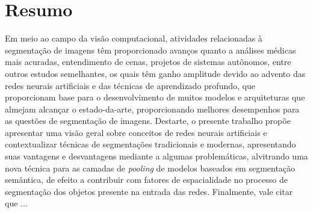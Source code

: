 \section*{Resumo}
\thispagestyle{empty}
\makeatletter
\makeatother
Em meio ao campo da visão computacional, atividades relacionadas à segmentação de imagens têm proporcionado avanços quanto a análises médicas mais acuradas, entendimento de cenas, projetos de sistemas autônomos, entre outros estudos semelhantes, os quais têm ganho amplitude devido ao advento das redes neurais artificiais e das técnicas de aprendizado profundo, que proporcionam base para o desenvolvimento de muitos modelos e arquiteturas que almejam alcançar o estado-da-arte, proporcionando melhores desempenhos para as questões de segmentação de imagens.
Destarte, o presente trabalho propõe apresentar uma visão geral sobre conceitos de redes neurais artificiais e contextualizar técnicas de segmentações tradicionais e modernas, apresentando suas vantagens e desvantagens mediante a algumas problemáticas, alvitrando uma nova técnica para as camadas de \textit{pooling} de modelos baseados em segmentação semântica, de efeito a contribuir com fatores de espacialidade no processo de segmentação dos objetos presente na entrada das redes.
Finalmente, vale citar que ...